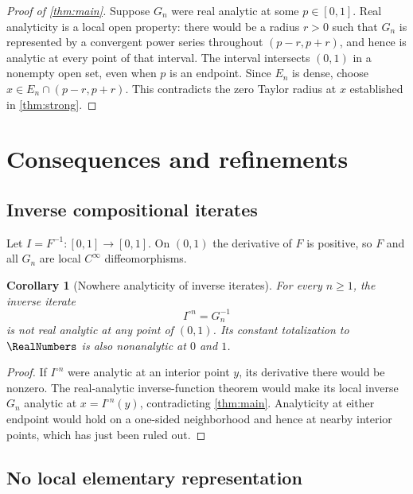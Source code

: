 \documentclass[11pt,oneside]{article}
\newtheorem{corollary}[theorem]{Corollary}
\theoremstyle{definition}
\theoremstyle{remark}
\newcommand{\comp}{\mathbin{\circ}}
\begin{document}
\begin{proof}[Proof of \cref{thm:main}]
Suppose $G_n$ were real analytic at some $p\in[0,1]$.  Real analyticity is a local open
property: there would be a radius $r>0$ such that $G_n$ is represented by a convergent
power series throughout $(p-r,p+r)$, and hence is analytic at every point of that
interval.  The interval intersects $(0,1)$ in a nonempty open set, even when $p$ is an
endpoint.  Since $E_n$ is dense, choose
$x\in E_n\cap(p-r,p+r)$.  This contradicts the zero Taylor radius at $x$ established
in \cref{thm:strong}.
\end{proof}

\section{Consequences and refinements}
\label{sec:consequences}

\subsection{Inverse compositional iterates}

Let $I=F^{-1}\colon[0,1]\to[0,1]$.  On $(0,1)$ the derivative of $F$ is positive, so
$F$ and all $G_n$ are local $C^\infty$ diffeomorphisms.

\begin{corollary}[Nowhere analyticity of inverse iterates]
\label{cor:inverse-iterates}
For every $n\geq1$, the inverse iterate
\begin{equation}
 I^{\comp n}=G_n^{-1}
 \end{equation}
is not real analytic at any point of $(0,1)$.  Its constant totalization to $\RealNumbers$ is
also nonanalytic at $0$ and $1$.
\end{corollary}

\begin{proof}
If $I^{\comp n}$ were analytic at an interior point $y$, its derivative there would be
nonzero.  The real-analytic inverse-function theorem would make its local inverse
$G_n$ analytic at $x=I^{\comp n}(y)$, contradicting \cref{thm:main}.  Analyticity at
either endpoint would hold on a one-sided neighborhood and hence at nearby interior
points, which has just been ruled out.
\end{proof}

\subsection{No local elementary representation}
\end{document}

